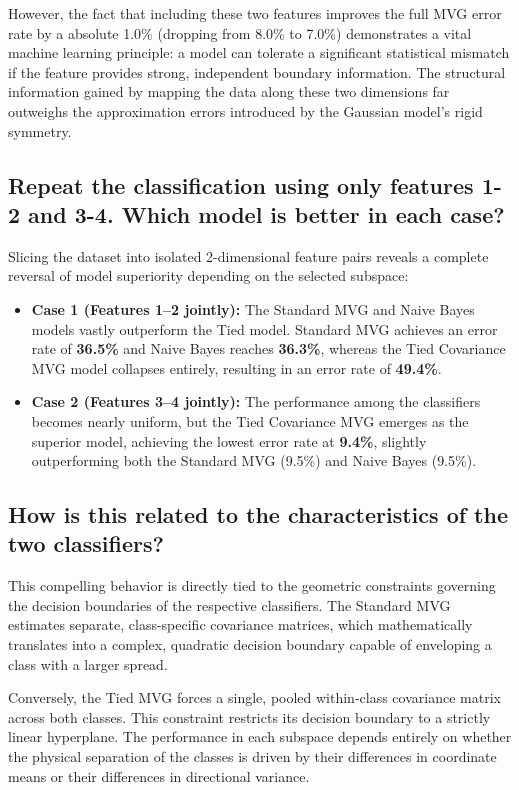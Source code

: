 However, the fact that including these two features improves the full MVG error rate by a absolute 1.0\% (dropping from 8.0\% to 7.0\%) demonstrates a vital machine learning principle: a model can tolerate a significant statistical mismatch if the feature provides strong, independent boundary information. The structural information gained by mapping the data along these two dimensions far outweighs the approximation errors introduced by the Gaussian model's rigid symmetry.

\subsection*{Repeat the classification using only features 1-2 and 3-4. Which model is better in each case?}

Slicing the dataset into isolated 2-dimensional feature pairs reveals a complete reversal of model superiority depending on the selected subspace:
\begin{itemize}
    \item \textbf{Case 1 (Features 1–2 jointly):} The Standard MVG and Naive Bayes models vastly outperform the Tied model. Standard MVG achieves an error rate of \textbf{36.5\%} and Naive Bayes reaches \textbf{36.3\%}, whereas the Tied Covariance MVG model collapses entirely, resulting in an error rate of \textbf{49.4\%}.
    \item \textbf{Case 2 (Features 3–4 jointly):} The performance among the classifiers becomes nearly uniform, but the Tied Covariance MVG emerges as the superior model, achieving the lowest error rate at \textbf{9.4\%}, slightly outperforming both the Standard MVG (9.5\%) and Naive Bayes (9.5\%).
\end{itemize}

\subsection*{How is this related to the characteristics of the two classifiers?}

This compelling behavior is directly tied to the geometric constraints governing the decision boundaries of the respective classifiers. The Standard MVG estimates separate, class-specific covariance matrices, which mathematically translates into a complex, quadratic decision boundary capable of enveloping a class with a larger spread. 

Conversely, the Tied MVG forces a single, pooled within-class covariance matrix across both classes. This constraint restricts its decision boundary to a strictly linear hyperplane. The performance in each subspace depends entirely on whether the physical separation of the classes is driven by their differences in coordinate means or their differences in directional variance.

